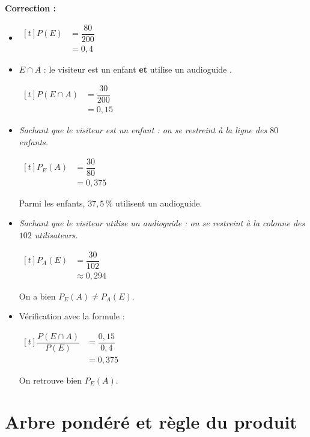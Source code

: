 \documentclass[10pt,a4paper]{article}
\begin{document}
\begin{bloc}
\textbf{Correction :}
\begin{itemize}
    \item \(\begin{aligned}[t] P(E)&=\dfrac{80}{200}\\ &=0{,}4\end{aligned}\)
    \item \(E\cap A\) : \og le visiteur est un enfant \textbf{et} utilise un audioguide \fg{}.

    \(\begin{aligned}[t] P(E\cap A)&=\dfrac{30}{200}\\ &=0{,}15\end{aligned}\)
    \item \textit{Sachant que le visiteur est un enfant : on se restreint à la ligne des \(80\) enfants.}

    \(\begin{aligned}[t] P_E(A)&=\dfrac{30}{80}\\ &=0{,}375\end{aligned}\)

    Parmi les enfants, \(37{,}5\,\%\) utilisent un audioguide.
    \item \textit{Sachant que le visiteur utilise un audioguide : on se restreint à la colonne des \(102\) utilisateurs.}

    \(\begin{aligned}[t] P_A(E)&=\dfrac{30}{102}\\ &\approx 0{,}294\end{aligned}\)

    On a bien \(P_E(A)\neq P_A(E)\).
    \item Vérification avec la formule :

    \(\begin{aligned}[t] \dfrac{P(E\cap A)}{P(E)}&=\dfrac{0{,}15}{0{,}4}\\ &=0{,}375\end{aligned}\)

    On retrouve bien \(P_E(A)\).
\end{itemize}
\end{bloc}

\section{Arbre pondéré et règle du produit} \label{annexe-arbre}
\end{document}
